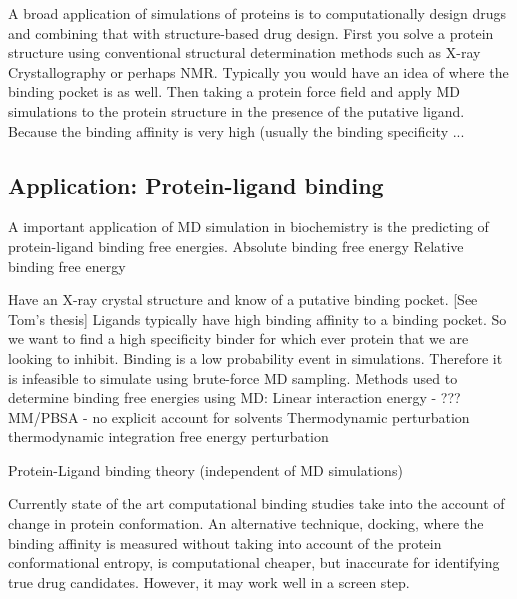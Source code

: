 \1 A broad application of simulations of proteins is to computationally design drugs and combining that with structure-based drug design.
  \2 First you solve a protein structure using conventional structural determination methods such as X-ray Crystallography or perhaps NMR.  Typically you would have an idea of where the binding pocket is as well. 
  \2 Then taking a protein force field and apply MD simulations to the protein structure in the presence of the putative ligand.  Because the binding affinity is very high (usually the binding specificity ...


\subsection{Application: Protein-ligand binding}
\1 A important application of MD simulation in biochemistry is the predicting of protein-ligand binding free energies.
  \2 
  \2 Absolute binding free energy
  \2 Relative binding free energy

\1 Have an X-ray crystal structure and know of a putative binding pocket. [See Tom's thesis]
\1 Ligands typically have high binding affinity to a binding pocket. So we want to find a high specificity binder for which ever protein that we are looking to inhibit.
  \2 Binding is a low probability event in simulations. Therefore it is infeasible to simulate using brute-force MD sampling.
  \2 Methods used to determine binding free energies using MD: 
  \3 Linear interaction energy - ???
  \3 MM/PBSA - no explicit account for solvents
  \3 Thermodynamic perturbation 
       \4 thermodynamic integration
       \4 free energy perturbation

\1 Protein-Ligand binding theory (independent of MD simulations)

  \2 Currently state of the art computational binding studies take into the account of change in protein conformation.  An alternative technique, docking, where the binding affinity is measured without taking into account of the protein conformational entropy, is computational cheaper, but inaccurate for identifying true drug candidates.  However, it may work well in a screen step.

